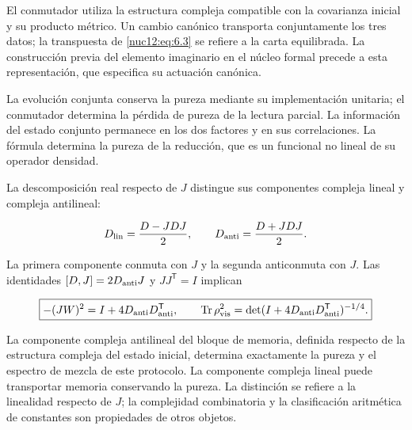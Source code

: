 El conmutador utiliza la estructura compleja compatible con la covarianza inicial y su producto métrico. Un cambio canónico transporta conjuntamente los tres datos; la transpuesta de \eqref{nuc12:eq:6.3} se refiere a la carta equilibrada. La construcción previa del elemento imaginario en el núcleo formal precede a esta representación, que especifica su actuación canónica.

La evolución conjunta conserva la pureza mediante su implementación unitaria; el conmutador determina la pérdida de pureza de la lectura parcial. La información del estado conjunto permanece en los dos factores y en sus correlaciones. La fórmula determina la pureza de la reducción, que es un funcional no lineal de su operador densidad.

La descomposición real respecto de \(J\) distingue sus componentes compleja lineal y compleja antilineal:



\[
D_{\rm lin}=\frac{D-JDJ}{2},\qquad
D_{\rm anti}=\frac{D+JDJ}{2}.
\]



La primera componente conmuta con \(J\) y la segunda anticonmuta con \(J\). Las identidades
\([D,J]=2D_{\rm anti}J\) y \(JJ^{\mathsf T}=I\) implican



\begin{equation}
\boxed{-(JW)^2=I+4D_{\rm anti}D_{\rm anti}^{\mathsf T},\qquad
\operatorname{Tr}\rho_{\rm vis}^2
=\det(I+4D_{\rm anti}D_{\rm anti}^{\mathsf T})^{-1/4}.}
\label{nuc12:eq:6.6}
\end{equation}



La componente compleja antilineal del bloque de memoria, definida respecto de la estructura compleja del estado inicial, determina exactamente la pureza y el espectro de mezcla de este protocolo. La componente compleja lineal puede transportar memoria conservando la pureza. La distinción se refiere a la linealidad respecto de \(J\); la complejidad combinatoria y la clasificación aritmética de constantes son propiedades de otros objetos.
